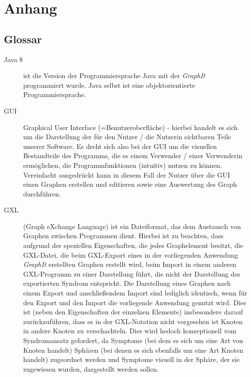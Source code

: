 \documentclass[enabledeprecatedfontcommands,fontsize=11pt,paper=a4,twoside]{scrartcl}
\newcounter{one}
\begin{document}
\clearpage
\section{Anhang} \label{sec:anhang}	



\subsection{Glossar}
\begin{description}
	\item[Java 8] ist die Version der Programmiersprache Java mit der \textit{GraphIt} programmiert wurde. Java selbst ist eine objektorientierte Programmiersprache. 
	\item[GUI] Graphical User Interface (=Benutzeroberfläche) - hierbei handelt es sich um die Darstellung der für den Nutzer / die Nutzerin sichtbaren Teile unserer Software. Es dreht sich also bei der GUI um die visuellen Bestandteile des Programms, die es einem Verwender / einer Verwenderin ermöglichen, die Programmfunktionen (intuitiv) nutzen zu können. Vereinfacht ausgedrückt kann in diesem Fall der Nutzer über die GUI einen Graphen erstellen und editieren sowie eine Auswertung des Graph durchführen. 
	\item[GXL] (Graph eXchange Language) ist ein Dateiformat, das dem Austausch von Graphen zwischen Programmen dient. Hierbei ist zu beachten, dass aufgrund der speziellen Eigenschaften, die jedes Graphelement besitzt, die GXL-Datei, die beim GXL-Export eines in der vorliegenden Anwendung \textit{GraphIt} erstellten Graphen erstellt wird, beim Import in einem anderen GXL-Programm zu einer Darstellung führt, die nicht der Darstellung des exportierten Syndrom entspricht. Die Darstellung eines Graphen nach einem Export und anschließendem Import sind lediglich identisch, wenn für den Export und den Import die vorliegende Anwendung genutzt wird. Dies ist (neben den Eigenschaften der einzelnen Elemente) insbesondere darauf zurückzuführen, dass es in der GXL-Notation nicht vorgesehen ist Knoten in andere Knoten zu verschachteln. Dies wird hedoch konzeptionell vom Syndromansatz gefordert, da Symptome (bei dem es sich um eine Art von Knoten handelt) Sphären (bei denen es sich ebenfalls um eine Art Knoten handelt) zugeordnet werden und Symptome visuell in der Sphäre, der sie zugewiesen wurden, dargestellt werden sollen.

\end{description}
\end{document}
